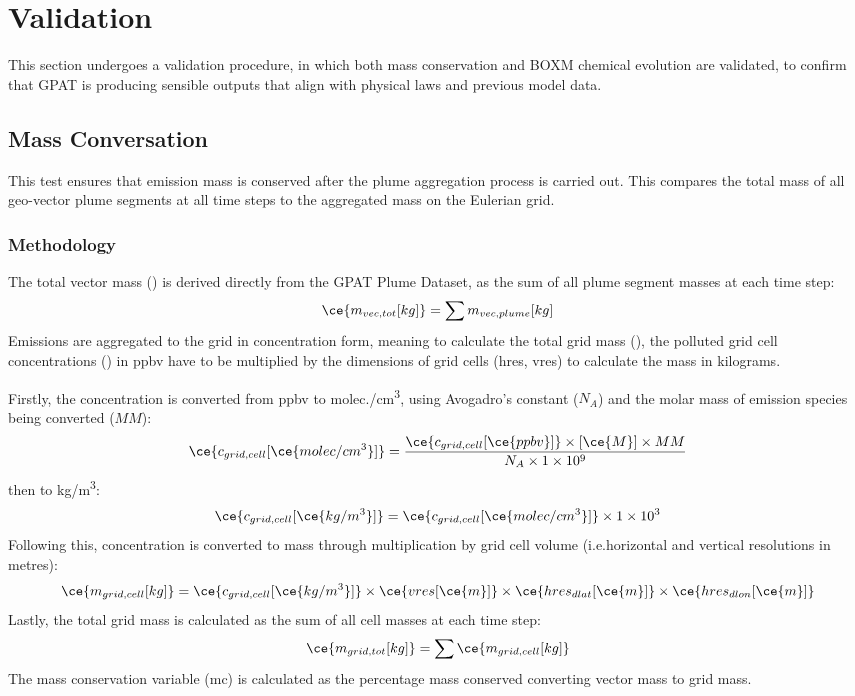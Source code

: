 \section{Validation}
This section undergoes a validation procedure, in which both mass conservation and BOXM chemical evolution are validated, to confirm that GPAT is producing sensible outputs that align with physical laws and previous model data.

\subsection{Mass Conversation}
This test ensures that emission mass is conserved after the plume aggregation process is carried out. This compares the total mass of all geo-vector plume segments at all time steps to the aggregated mass on the Eulerian grid.

\subsubsection{Methodology}
The total vector mass () is derived directly from the GPAT Plume Dataset, as the sum of all plume segment masses at each time step:
\begin{equation}
    \ce{m_{vec,tot} [kg]} = \sum m_{vec,plume} [kg]
\end{equation}
Emissions are aggregated to the grid in concentration form, meaning to calculate the total grid mass (), the polluted grid cell concentrations () in ppbv have to be multiplied by the dimensions of grid cells (hres, vres) to calculate the mass in kilograms. 

Firstly, the concentration is converted from ppbv to molec./cm\textsuperscript{3}, using Avogadro's constant ($N_A$) and the molar mass of emission species being converted ($MM$): 
\begin{equation}
    \ce{c_{grid,cell} [\ce{molec/cm^3}]} = \frac{\ce{c_{grid,cell} [\ce{ppbv}]} \times [\ce{M}] \times MM}{N_A \times 1 \times 10^9}
\end{equation}
then to kg/m\textsuperscript{3}:
\begin{equation}
    \ce{c_{grid,cell} [\ce{kg/m^3}]} = \ce{c_{grid,cell} [\ce{molec/cm^3}]} \times 1 \times 10^3
\end{equation}
Following this, concentration is converted to mass through multiplication by grid cell volume (i.e.horizontal and vertical resolutions in metres):
\begin{equation}
    \ce{m_{grid,cell} [kg]} = \ce{c_{grid,cell} [\ce{kg/m^3}]} \times \ce{vres [\ce{m}]} \times \ce{hres_{dlat} [\ce{m}]} \times \ce{hres_{dlon} [\ce{m}]}
\end{equation}
Lastly, the total grid mass is calculated as the sum of all cell masses at each time step:
\begin{equation}
    \ce{m_{grid,tot} [kg]} = \sum \ce{m_{grid,cell} [kg]}
\end{equation}
The mass conservation variable (mc) is calculated as the percentage mass conserved converting vector mass to grid mass.

